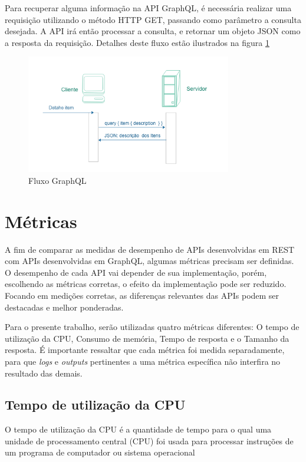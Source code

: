 Para recuperar alguma informação na API GraphQL, é necessária realizar uma requisição utilizando o método HTTP GET, passando como parâmetro a consulta desejada. A API irá então processar a consulta, e retornar um objeto JSON como a resposta da requisição. Detalhes deste fluxo estão ilustrados na figura \ref{fig:graph-uml}

\begin{figure}[htbp]
\centering
\includegraphics[width=0.8\textwidth]{figuras/uml-graph.png}
\caption{Fluxo GraphQL}
\label{fig:graph-uml}
\end{figure}

\section{Métricas}\label{sec:metrics}

A fim de comparar as medidas de desempenho de APIs desenvolvidas em REST com APIs desenvolvidas em GraphQL, algumas métricas precisam ser definidas. O desempenho de cada API vai depender de sua implementação, porém, escolhendo as métricas corretas, o efeito da implementação pode ser reduzido. Focando em medições corretas, as diferenças relevantes das APIs podem ser destacadas e melhor ponderadas.

Para o presente trabalho, serão utilizadas quatro métricas diferentes: O tempo de utilização da CPU, Consumo de memória, Tempo de resposta e o Tamanho da resposta. É importante ressaltar que cada métrica foi medida separadamente, para que \textit{logs} e \textit{outputs} pertinentes a uma métrica específica não interfira no resultado das demais.

\subsection*{Tempo de utilização da CPU}

O tempo de utilização da CPU é a quantidade de tempo para o qual uma unidade de processamento central (CPU) foi usada para processar instruções de um programa de computador ou sistema operacional


